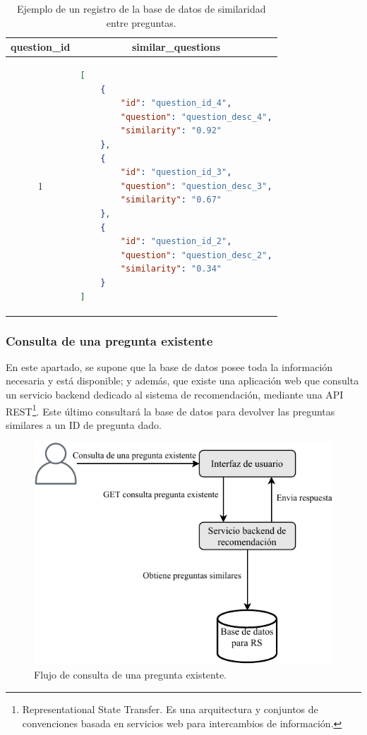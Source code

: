 \begin{table}[h!]
	\centering
	\footnotesize
	\caption{Ejemplo de un registro de la base de datos de similaridad entre preguntas.}
	\begin{tabular}{|c|l|}
		\hline
		\textbf{question\_id} &
		\multicolumn{1}{c|}{\textbf{similar\_questions}} \\ \hline
		1 & \begin{lstlisting}[language=json]
[
	{
		"id": "question_id_4",
		"question": "question_desc_4",
		"similarity": "0.92"
	},
	{
		"id": "question_id_3",
		"question": "question_desc_3",
		"similarity": "0.67"
	},
	{
		"id": "question_id_2",
		"question": "question_desc_2",
		"similarity": "0.34"
	}
]
		\end{lstlisting} \\ \hline
	\end{tabular}
	\label{tab:table-similar-questions}
\end{table}

\subsubsection{Consulta de una pregunta existente}
En este apartado, se supone que la base de datos posee toda la información necesaria y está disponible; y además, que existe una aplicación web que consulta un servicio backend dedicado al sistema de recomendación, mediante una API REST\footnote{Representational State Transfer. Es una arquitectura y conjuntos de convenciones basada en servicios web para intercambios de información.}. Este último consultará la base de datos para devolver las preguntas similares a un ID de pregunta dado.

\begin{figure}[h!]
	\centering
	\includegraphics[width=0.6\linewidth]{8_problema_investigacion/imagenes/implementacion_rs_consulta}
	\caption{Flujo de consulta de una pregunta existente.}
	\label{fig:implementacionrsconsulta}
\end{figure}

